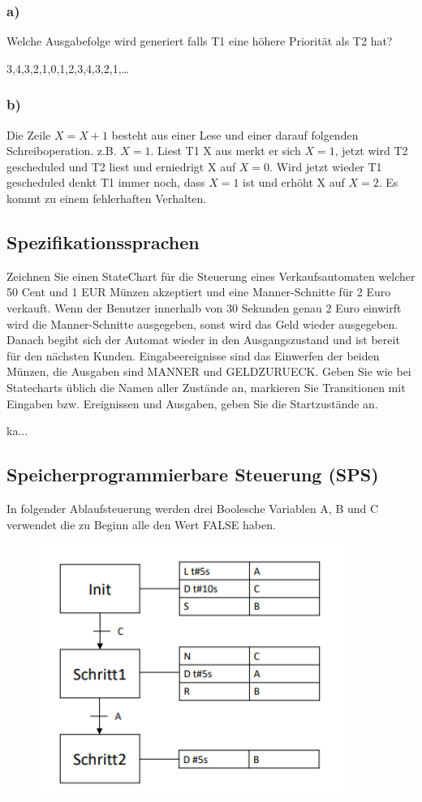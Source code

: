 \subsubsection{a)}
Welche Ausgabefolge wird generiert falls T1 eine höhere Priorität als T2 hat?

3,4,3,2,1,0,1,2,3,4,3,2,1,\dots

\subsubsection{b)}
Die Zeile $X = X + 1$ besteht aus einer Lese und einer darauf folgenden Schreiboperation.
z.B. $X=1$. Liest T1 X aus merkt er sich $X=1$, jetzt wird T2 gescheduled und T2 liest und erniedrigt X auf $X=0$.
Wird jetzt wieder T1 gescheduled denkt T1 immer noch, dass $X=1$ ist und erhöht X auf $X=2$. Es kommt zu einem
fehlerhaften Verhalten.

\subsection{Spezifikationssprachen}
Zeichnen Sie einen StateChart für die Steuerung eines Verkaufsautomaten welcher 50 Cent und 1 EUR
Münzen akzeptiert und eine Manner-Schnitte für 2 Euro verkauft. Wenn der Benutzer innerhalb von 30
Sekunden genau 2 Euro einwirft wird die Manner-Schnitte ausgegeben, sonst wird das Geld wieder
ausgegeben. Danach begibt sich der Automat wieder in den Ausgangszustand und ist bereit für den
nächsten Kunden. Eingabeereignisse sind das Einwerfen der beiden Münzen, die Ausgaben sind MANNER
und GELDZURUECK.
Geben Sie wie bei Statecharts üblich die Namen aller Zustände an, markieren Sie Transitionen mit Eingaben
bzw. Ereignissen und Ausgaben, geben Sie die Startzustände an.

ka...
\subsection{Speicherprogrammierbare Steuerung (SPS)}
In folgender Ablaufsteuerung werden drei Boolesche Variablen A, B und C verwendet die zu Beginn alle den
Wert FALSE haben. 

\begin{figure}[H]
  \includegraphics[width=10cm]{images/KA140421/6a.PNG}
  \centering
\end{figure}

